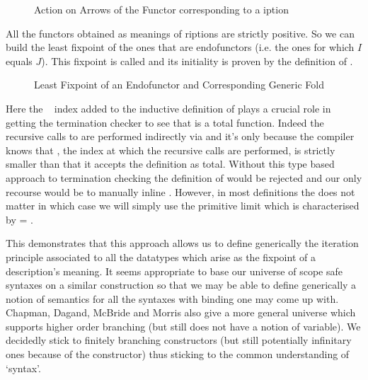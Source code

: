 \begin{figure}[h]
\caption{Action on Arrows of the Functor corresponding to a iption}
\end{figure}

All the functors obtained as meanings of riptions are strictly
positive. So we can build the least fixpoint of the ones that are endofunctors
(i.e. the ones for which $I$ equals $J$). This fixpoint is called 
and its initiality is proven by the definition of  .

\begin{figure}[h]
\caption{Least Fixpoint of an Endofunctor and Corresponding Generic Fold}
\end{figure}

Here the ~\cite{DBLP:journals/corr/abs-1012-4896} index added
to the inductive definition of  plays a crucial role in getting
the termination checker to see that  is a total function.
Indeed the recursive calls to  are performed indirectly via
 and it's only because the compiler knows that , the index
at which the recursive calls are performed, is strictly smaller than
  that it accepts the definition as total. Without this type
based approach to termination checking the definition of  would
be rejected and our only recourse would be to manually inline .
However, in most definitions the  does not matter in which case
we will simply use the primitive limit   which is
characterised by  =  .

This demonstrates that this approach allows us to define generically
the iteration principle associated to all the datatypes which arise
as the fixpoint of a description's meaning. It seems appropriate to
base our universe of scope safe syntaxes on a similar construction
so that we may be able to define generically a notion of semantics
for all the syntaxes with binding one may come up with. Chapman,
Dagand, McBride and Morris also give a more general universe which
supports higher order branching (but still does not have a notion
of variable). We decidedly stick to finitely branching constructors
(but still potentially infinitary ones because of the 
constructor) thus sticking to the common understanding of `syntax'.




